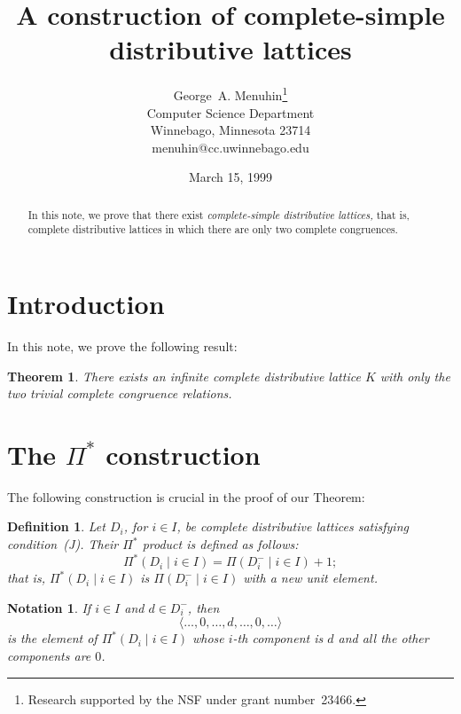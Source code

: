 \documentclass{article}
\newtheorem{theorem}{Theorem}
\newtheorem{definition}{Definition}
\newtheorem{notation}{Notation}
\begin{document}
\title{A construction of complete-simple\\
       distributive lattices}
\author{George~A. Menuhin\thanks{Research supported
   by the NSF under grant number~23466.}\\
   Computer Science Department\\
   Winnebago, Minnesota 23714\\
   menuhin@cc.uwinnebago.edu}
\date{March 15, 1999}
\maketitle

\begin{abstract}
   In this note, we prove that there exist \emph{complete-simple
   distributive lattices,} that is, complete distributive
   lattices in which there are only two complete congruences.
\end{abstract}

\section{Introduction}\label{S:intro}
In this note, we prove the following result:

\begin{theorem}
   There exists an infinite complete distributive lattice $K$
   with only the two trivial complete congruence relations.
\end{theorem}

\section{The $\Pi^{*}$ construction}\label{S:P*}
The following construction is crucial in the proof of our Theorem:

\begin{definition}\label{D:P*}
   Let $D_{i}$, for $i \in I$, be complete distributive
   lattices satisfying condition~\textup{(J)}.  Their
   $\Pi^{*}$ product is defined as follows:
   \[
      \Pi^{*} ( D_{i} \mid i \in I ) =
       \Pi ( D_{i}^{-} \mid i \in I ) + 1;
   \]
   that is, $\Pi^{*} ( D_{i} \mid i \in I )$ is
   $\Pi ( D_{i}^{-} \mid i \in I )$ with a new unit element.
\end{definition}

\begin{notation}
   If $i \in I$ and $d \in D_{i}^{-}$, then
   \[
      \langle \ldots, 0, \ldots, d, \ldots, 0, \ldots \rangle
   \]
   is the element of $\Pi^{*} ( D_{i} \mid i \in I )$ whose
   $i$-th component is $d$ and all the other components
   are $0$.
\end{notation}
\end{document}
